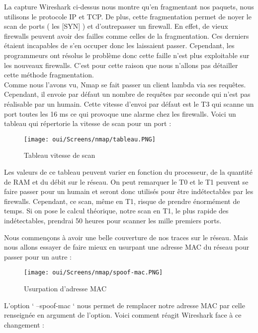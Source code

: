 \newpage
La capture Wireshark ci-dessus nous montre qu’en fragmentant nos paquets, nous utilisons le protocole IP et TCP. De plus, cette fragmentation permet de noyer le scan de ports ( les [SYN] ) et d’outrepasser un firewall. En effet, de vieux firewalls peuvent avoir des failles comme celles de la fragmentation. Ces derniers étaient incapables de s’en occuper donc les laissaient passer. Cependant, les programmeurs ont résolus le problème donc cette faille n’est plus exploitable sur les nouveaux firewalls. C'est pour cette raison que nous n'allons pas détailler cette méthode fragmentation.\\
Comme nous l'avons vu, Nmap se fait passer un client lambda via ses requêtes. Cependant, il envoie par défaut un nombre de requêtes par seconde qui n'est pas réalisable par un humain. Cette vitesse d'envoi par défaut est le T3 qui scanne un port toutes les 16 ms ce qui provoque une alarme chez les firewalls. Voici un tableau qui répertorie la vitesse de scan pour un port :

\begin{figure}[htp!]
  \centering
  \setlength\figureheight{7cm}
  \setlength\figurewidth{9cm}
  \texttt{[image: oui/Screens/nmap/tableau.PNG]}
  \caption{Tableau vitesse de scan}
  \label{fig:courbe-tikz}
\end{figure}

Les valeurs de ce tableau peuvent varier en fonction du processeur, de la quantité de RAM et du débit sur le réseau. On peut remarquer le T0 et le T1 peuvent se faire passer pour un humain et seront donc utilisés pour être indétectables par les firewalls. Cependant, ce scan, même en T1, risque de prendre énormément de temps. Si on pose le calcul théorique, notre scan en T1, le plus rapide des indétectables, prendrai 50 heures pour scanner les mille premiers ports.
 

\newpage
Nous commençons à avoir une belle couverture de nos traces sur le réseau. Mais nous allons essayer de faire mieux en usurpant une adresse MAC du réseau pour passer pour un autre :

\begin{figure}[htp!]
  \centering
  \setlength\figureheight{7cm}
  \setlength\figurewidth{9cm}
  \texttt{[image: oui/Screens/nmap/spoof-mac.PNG]}
  \caption{Usurpation d'adresse MAC}
  \label{fig:courbe-tikz}
\end{figure}

L’option ‘ --spoof-mac ‘ nous permet de remplacer notre adresse MAC par celle renseignée en argument de l’option. Voici comment réagit Wireshark face à ce changement :

